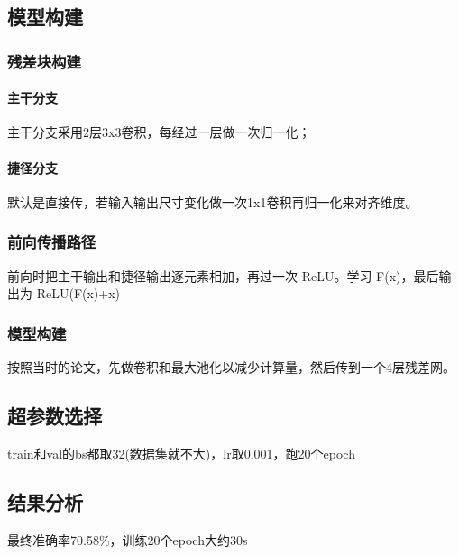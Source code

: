 \documentclass{article}
\begin{document}
\subsection{模型构建}
\subsubsection{残差块构建}
\paragraph{主干分支}
主干分支采用2层3x3卷积，每经过一层做一次归一化；
\paragraph{捷径分支}
默认是直接传，若输入输出尺寸变化做一次1x1卷积再归一化来对齐维度。
\subsubsection{前向传播路径}
前向时把主干输出和捷径输出逐元素相加，再过一次 ReLU。学习 F(x)，最后输出为 ReLU(F(x)+x)
\subsubsection{模型构建}
按照当时的论文，先做卷积和最大池化以减少计算量，然后传到一个4层残差网。
\subsection{超参数选择}
train和val的bs都取32(数据集就不大)，lr取0.001，跑20个epoch
\subsection{结果分析}
最终准确率70.58\%，训练20个epoch大约30s
\end{document}
